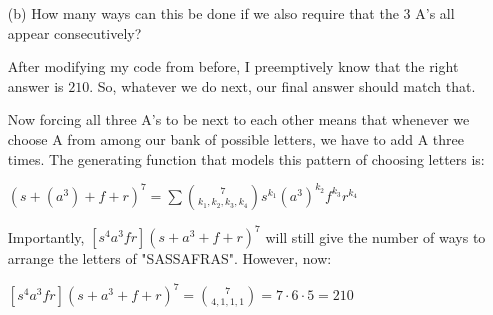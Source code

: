 \documentclass{book}
\newcommand{\exOne}{%
   \color{Purple}%
   \fontsize{13}{15}\selectfont%
}
\newenvironment{myIndent}{%
   \begin{adjustwidth}{2.5em}{0em}%
}{%
   \end{adjustwidth}%
}
\newcommand{\retTwo}{\hfill\bigbreak}
\begin{document}
\begin{enumerate}
   \item[(b)] How many ways can this be done if we also require that the 3 A's all appear consecutively?
   
   \begin{myIndent}\exOne
      After modifying my code from before, I preemptively know that the right\\ answer is $210$. So, whatever we do next, our final answer should match that.\retTwo

      Now forcing all three A's to be next to each other means that whenever we choose A from among our bank of possible letters, we have to add A three times. The generating function that models this pattern of choosing letters is:
      
      {\centering $(s + (a^3) + f + r)^7 = \sum \binom{7}{k_1, k_2, k_3, k_4}s^{k_1}(a^3)^{k_2}f^{k_3}r^{k_4}$  \retTwo\par}

      Importantly, $[s^4a^3fr](s + a^3 + f + r)^7$ will still give the number of ways to arrange the letters of "SASSAFRAS". However, now:

      {\centering $[s^4a^3fr](s + a^3 + f + r)^7 = \binom{7}{4, 1, 1, 1} = 7\cdot6\cdot 5 = 210$\retTwo\par}
   \end{myIndent}
\end{enumerate}
\end{document}
